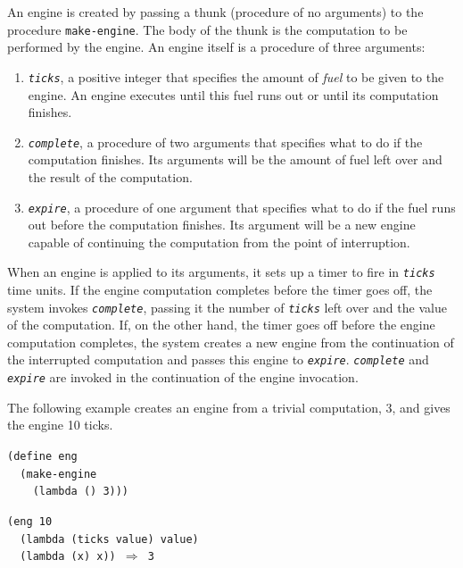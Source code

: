 An engine is created by passing a thunk (procedure of no arguments)
to the procedure \texttt{make-engine}.
The body of the thunk is the computation to be performed by the engine.
An engine itself is a procedure of three arguments:

\begin{enumerate}
\label{examples_g209}\item 
\label{examples_s89}\texttt{\textit{ticks}},
a positive integer that specifies the amount of \textit{fuel} to be given
to the engine.
An engine executes until this fuel runs out or until its computation
finishes.


\label{examples_g210}\item 
\label{examples_s90}\texttt{\textit{complete}},
a procedure of two arguments that
specifies what to do if the computation finishes.
Its arguments will be the amount of fuel left over and the
result of the computation.



\label{examples_g211}\item 
\label{examples_s91}\texttt{\textit{expire}},
a procedure of one argument that specifies what to do if the fuel runs
out before the computation finishes.
Its argument will be a new engine capable of continuing the computation
from the point of interruption.

\end{enumerate}


When an engine is applied to its arguments, it sets up a timer
to fire in \texttt{\textit{ticks}} time units.
If the engine computation completes before the timer goes off, the
system invokes \texttt{\textit{complete}}, passing it the
number of \texttt{\textit{ticks}} left over
and the value of the computation.
If, on the other hand, the timer goes off before the engine computation
completes, the system creates a new engine from the continuation of
the interrupted computation and passes this engine to \texttt{\textit{expire}}.
\texttt{\textit{complete}} and \texttt{\textit{expire}} are invoked in the continuation
of the engine invocation.


The following example creates an engine from a trivial computation,
3, and gives the engine 10 ticks.


\begin{alltt}
(define eng
  (make-engine
    (lambda () 3)))

(eng 10
  (lambda (ticks value) value)
  (lambda (x) x)) \(\Rightarrow\) 3
\end{alltt}


